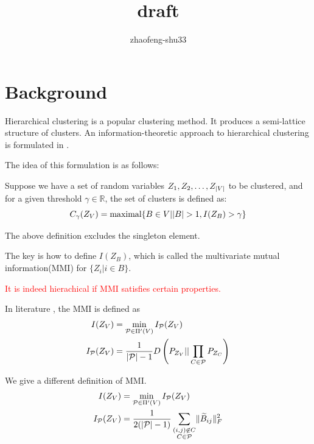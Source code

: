 \documentclass{article}
\DeclarePairedDelimiter\abs{\lvert}{\rvert}
\DeclarePairedDelimiter\norm{\lVert}{\rVert}
\def\red#1{\textcolor{red}{#1}}
\theoremstyle{definition}
\begin{document}
\title{draft}
\author{zhaofeng-shu33}
\maketitle
\section{Background}
Hierarchical clustering is a popular clustering method. It produces a semi-lattice structure of clusters. 
An information-theoretic approach to hierarchical clustering is formulated in \cite{ic}.

The idea of this formulation is as follows:

Suppose we have a set of random variables $Z_1, Z_2, \dots, Z_{\abs{V}}$ to be clustered, and for a given threshold $\gamma \in \mathbb{R}$, the set of clusters is defined as:
\begin{equation}
C_{\gamma}(Z_V) = \textrm{maximal}\{ B \in V \vert \abs{B} > 1, I(Z_B) > \gamma \}
\end{equation}

The above definition excludes the singleton element.

The key is how to define $I(Z_B)$, which is called the multivariate mutual information(MMI) for $\{Z_i | i \in B\}$.

\red{It is indeed hierachical if MMI satisfies certain properties.}

In literature \cite{ic}, the MMI is defined as 
\begin{align}
I(Z_V) & = \min_{\mathcal{P} \in \Pi'(V)} I_{\mathcal{P}}(Z_V) \\
\label{eq:MMI_o} I_{\mathcal{P}}(Z_V) & = {1 \over \abs{\mathcal{P}} -1 } D\left(P_{Z_V}|| \prod_{C\in \mathcal{P}} P_{Z_C} \right) 
\end{align}

We give a different definition of MMI.
\begin{align}
I(Z_V) & = \min_{\mathcal{P} \in \Pi'(V)} I_{\mathcal{P}}(Z_V) \\
\label{eq:newDef}  I_{\mathcal{P}}(Z_V) & = {1 \over 2( \abs{\mathcal{P}} - 1) } \sum_{\substack{(i,j) \not\in C\\ C\in \mathcal{P}}} \norm{\widetilde{B}_{ij}}_F^2
\end{align}
\end{document}
